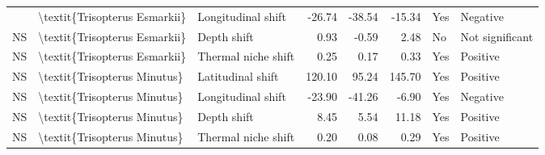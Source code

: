 \begin{longtable}[t]{lllrrrll}
{{NS & \textbackslash{}textit\{Trisopterus Esmarkii\} & Longitudinal shift & -26.74 & -38.54 & -15.34 & Yes & Negative\\
NS & \textbackslash{}textit\{Trisopterus Esmarkii\} & Depth shift & 0.93 & -0.59 & 2.48 & No & Not significant\\
NS & \textbackslash{}textit\{Trisopterus Esmarkii\} & Thermal niche shift & 0.25 & 0.17 & 0.33 & Yes & Positive\\
NS & \textbackslash{}textit\{Trisopterus Minutus\} & Latitudinal shift & 120.10 & 95.24 & 145.70 & Yes & Positive\\
\addlinespace
NS & \textbackslash{}textit\{Trisopterus Minutus\} & Longitudinal shift & -23.90 & -41.26 & -6.90 & Yes & Negative\\
NS & \textbackslash{}textit\{Trisopterus Minutus\} & Depth shift & 8.45 & 5.54 & 11.18 & Yes & Positive\\
NS & \textbackslash{}textit\{Trisopterus Minutus\} & Thermal niche shift & 0.20 & 0.08 & 0.29 & Yes & Positive\\*
\end{longtable}